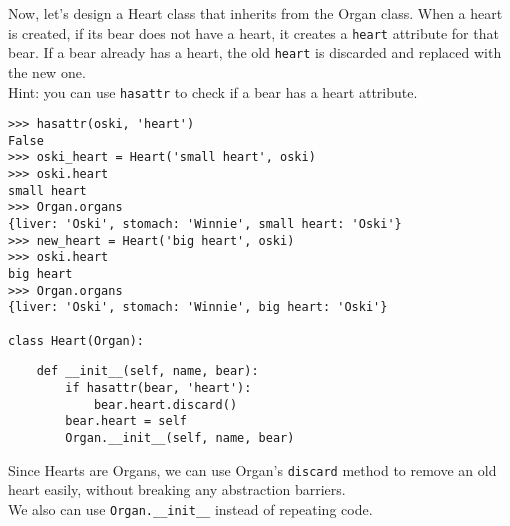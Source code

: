 \begin{blocksection}
\question Now, let's design a Heart class that inherits from the Organ class.
When a heart is created, if its bear does not have a heart, it creates a \lstinline{heart} attribute for that bear.
If a bear already has a heart, the old \lstinline{heart} is discarded and replaced with the new one.
\\Hint: you can use \lstinline{hasattr} to check if a bear has a heart attribute.

\vspace{1\baselineskip}
\begin{lstlisting}
>>> hasattr(oski, 'heart')
False
>>> oski_heart = Heart('small heart', oski)
>>> oski.heart
small heart
>>> Organ.organs
{liver: 'Oski', stomach: 'Winnie', small heart: 'Oski'}
>>> new_heart = Heart('big heart', oski)
>>> oski.heart
big heart
>>> Organ.organs
{liver: 'Oski', stomach: 'Winnie', big heart: 'Oski'}

class Heart(Organ):
\end{lstlisting}

\begin{nonsol}
\vspace{5\baselineskip}
\end{nonsol}

\begin{solution}
  \vspace{-0.5\baselineskip}
\begin{lstlisting}
    def __init__(self, name, bear):
        if hasattr(bear, 'heart'):
            bear.heart.discard()
        bear.heart = self
        Organ.__init__(self, name, bear)
\end{lstlisting}
Since Hearts are Organs, we can use Organ's \lstinline{discard} method to remove an old heart easily, without breaking any abstraction barriers.
\\We also can use \lstinline{Organ.__init__} instead of repeating code.
\end{solution}
\end{blocksection}


